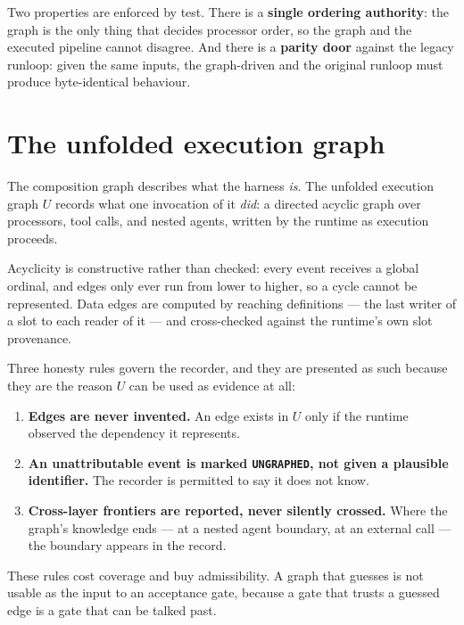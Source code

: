 Two properties are enforced by test. There is a \textbf{single ordering
authority}: the graph is the only thing that decides processor order, so
the graph and the executed pipeline cannot disagree. And there is a
\textbf{parity door} against the legacy runloop: given the same inputs, the
graph-driven and the original runloop must produce byte-identical
behaviour.

\section{The unfolded execution graph}
\label{sec:unfolded}

The composition graph describes what the harness \emph{is}. The unfolded
execution graph $U$ records what one invocation of it \emph{did}: a
directed acyclic graph over processors, tool calls, and nested agents,
written by the runtime as execution proceeds.

Acyclicity is constructive rather than checked: every event receives a
global ordinal, and edges only ever run from lower to higher, so a cycle
cannot be represented. Data edges are computed by reaching definitions ---
the last writer of a slot to each reader of it --- and cross-checked
against the runtime's own slot provenance.

Three honesty rules govern the recorder, and they are presented as such
because they are the reason $U$ can be used as evidence at all:

\begin{enumerate}
  \item \textbf{Edges are never invented.} An edge exists in $U$ only if
        the runtime observed the dependency it represents.
  \item \textbf{An unattributable event is marked \texttt{UNGRAPHED}, not
        given a plausible identifier.} The recorder is permitted to say it
        does not know.
  \item \textbf{Cross-layer frontiers are reported, never silently
        crossed.} Where the graph's knowledge ends --- at a nested agent
        boundary, at an external call --- the boundary appears in the
        record.
\end{enumerate}

These rules cost coverage and buy admissibility. A graph that guesses is
not usable as the input to an acceptance gate, because a gate that trusts a
guessed edge is a gate that can be talked past.


